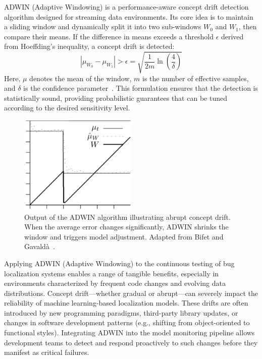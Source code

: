 \documentclass[manuscript,screen,review]{acmart}
\begin{document}
ADWIN (Adaptive Windowing) is a performance-aware concept drift detection algorithm designed for streaming data environments. Its core idea is to maintain a sliding window and dynamically split it into two sub-windows \( W_0 \) and \( W_1 \), then compare their means. If the difference in means exceeds a threshold \( \epsilon \) derived from Hoeffding’s inequality, a concept drift is detected:
\[
\left| \mu_{W_0} - \mu_{W_1} \right| > \epsilon = \sqrt{ \frac{1}{2m} \ln \left( \frac{4}{\delta} \right) }
\]
Here, \( \mu \) denotes the mean of the window, \( m \) is the number of effective samples, and \( \delta \) is the confidence parameter~\cite{Bifet2007}.
This formulation ensures that the detection is statistically sound, providing probabilistic guarantees that can be tuned according to the desired sensitivity level.

\begin{figure}[H]
  \centering
  \includegraphics[width=0.5\textwidth]{picture/5.1fig2.png}
  \caption{Output of the ADWIN algorithm illustrating abrupt concept drift. When the average error changes significantly, ADWIN shrinks the window and triggers model adjustment. Adapted from Bifet and Gavaldà~\cite{Bifet2007}.}
  \label{fig:adwin}
\end{figure}

Applying ADWIN (Adaptive Windowing) to the continuous testing of bug localization systems enables a range of tangible benefits, especially in environments characterized by frequent code changes and evolving data distributions. Concept drift---whether gradual or abrupt---can severely impact the reliability of machine learning-based localization models. These drifts are often introduced by new programming paradigms, third-party library updates, or changes in software development patterns (e.g., shifting from object-oriented to functional styles). Integrating ADWIN into the model monitoring pipeline allows development teams to detect and respond proactively to such changes before they manifest as critical failures.
\end{document}
